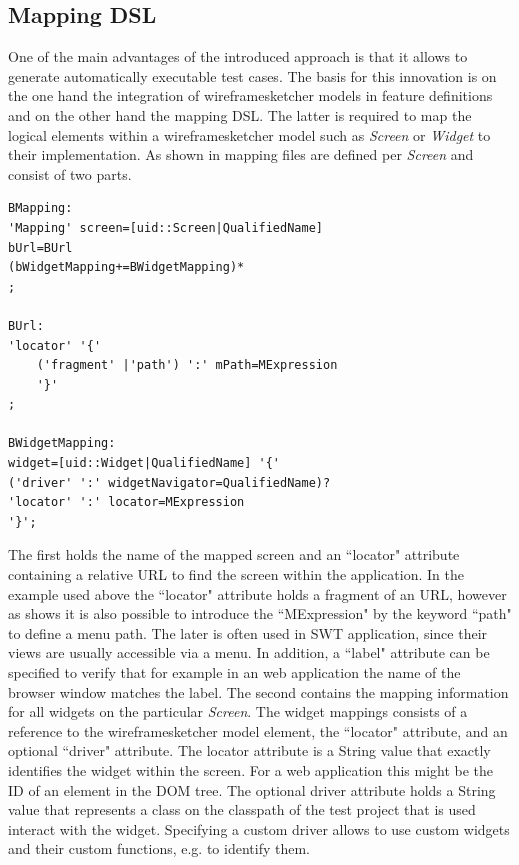 \documentclass{sig-alternate-05-2015}
\begin{document}
\subsection{Mapping DSL}
One of the main advantages of the introduced approach is that it allows to generate automatically executable test cases.
The basis for this innovation is on the one hand the integration of wireframesketcher models in feature definitions and on the other hand the mapping DSL.
The latter is required to map the logical elements within a wireframesketcher model such as \textit{Screen} or \textit{Widget} to their implementation.
As shown in  mapping files are defined per \textit{Screen} and consist of two parts.

\begin{lstlisting}[captionpos=b, caption=Mapping Grammar, label={lst:mappingGrammar}, language=xtext]
BMapping:
'Mapping' screen=[uid::Screen|QualifiedName]
bUrl=BUrl
(bWidgetMapping+=BWidgetMapping)*
;

BUrl:
'locator' '{'
	('fragment' |'path') ':' mPath=MExpression
	'}'
;

BWidgetMapping:
widget=[uid::Widget|QualifiedName] '{'
('driver' ':' widgetNavigator=QualifiedName)?
'locator' ':' locator=MExpression
'}';
\end{lstlisting}

The first holds the name of the mapped screen and an ``locator" attribute containing a relative URL to find the screen within the application.
In the example used above the ``locator" attribute holds a fragment of an URL, however as  shows it is also possible to introduce the ``MExpression" by the keyword ``path" to define a menu path.
The later is often used in SWT application, since their views are usually accessible via a menu.  
In addition, a ``label" attribute can be specified to verify that for example in an web application the name of the browser window matches the label.
The second contains the mapping information for all widgets on the particular \textit{Screen}.
The widget mappings consists of a reference to the wireframesketcher model element, the ``locator" attribute, and an optional ``driver" attribute.
The locator attribute is a String value that exactly identifies the widget within the screen.
For a web application this might be the ID of an element in the DOM tree.
The optional driver attribute holds a String value that represents a class on the classpath of the test project that is used interact with the widget.
Specifying a custom driver allows to use custom widgets and their custom functions, e.g. to identify them.
\end{document}
